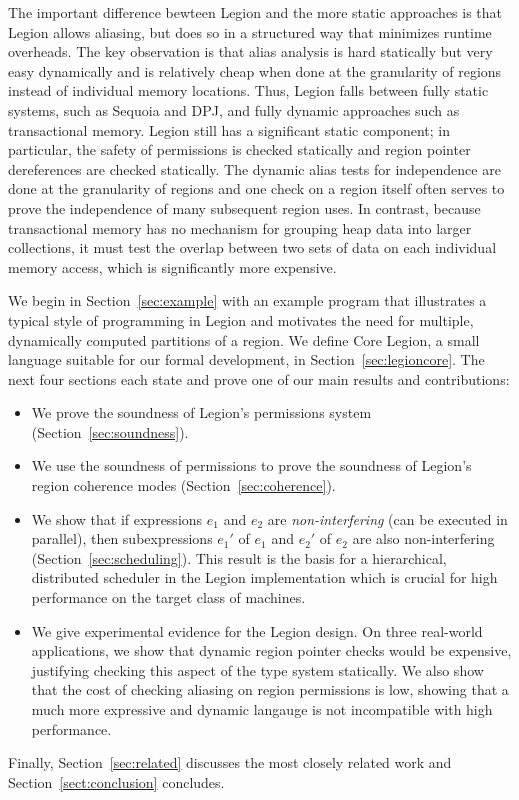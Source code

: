 The important difference bewteen Legion and the more static approaches
is that Legion allows aliasing, but does so in a structured way that minimizes
runtime overheads.  The key observation is that
alias analysis is hard statically but very easy dynamically and is relatively cheap
when done at the granularity of regions instead of individual memory
locations.  Thus, Legion falls between fully static systems, such as
Sequoia and DPJ, and fully dynamic approaches such as transactional
memory.  Legion still has a significant static component; in
particular, the safety of permissions is checked statically and region
pointer dereferences are checked statically.  The dynamic alias tests
for independence are done at the granularity of regions and one check on a region
itself often serves to prove the independence of many subsequent region
uses.  In contrast, because transactional memory has no mechanism
for grouping heap data into larger collections, it must test the
overlap between two sets of data on each individual memory access, which is
significantly more expensive.

We begin in Section~\ref{sec:example} with an example program that illustrates
a typical style of programming in Legion and motivates the need for multiple, dynamically computed partitions of
a region.  We define Core Legion, a small language suitable for our formal development, in Section~\ref{sec:legioncore}.
The next four sections each state and prove one of our main results and contributions:
\begin{itemize}
\item We prove the soundness of Legion's permissions system (Section~\ref{sec:soundness}).

\item We use the soundness of permissions to prove the soundness of Legion's region coherence modes (Section~\ref{sec:coherence}).

\item We show that if expressions $e_1$ and $e_2$ are {\em non-interfering} (can be executed in parallel), then subexpressions
$e_1'$ of $e_1$ and $e_2'$ of $e_2$ are also non-interfering (Section~\ref{sec:scheduling}).  This result is the basis
for a hierarchical, distributed scheduler in the Legion implementation which is crucial for high performance
on the target class of machines.

\item We give experimental evidence for the Legion design.  On three real-world applications, we show that 
dynamic region pointer checks would be expensive, justifying checking this aspect of the type system statically.
We also show that the cost of checking aliasing on region permissions is low, showing that a much more expressive
and dynamic langauge is not incompatible with high performance.

\end{itemize}
Finally, Section~\ref{sec:related} discusses the most closely related work and
Section~\ref{sect:conclusion} concludes.


  










